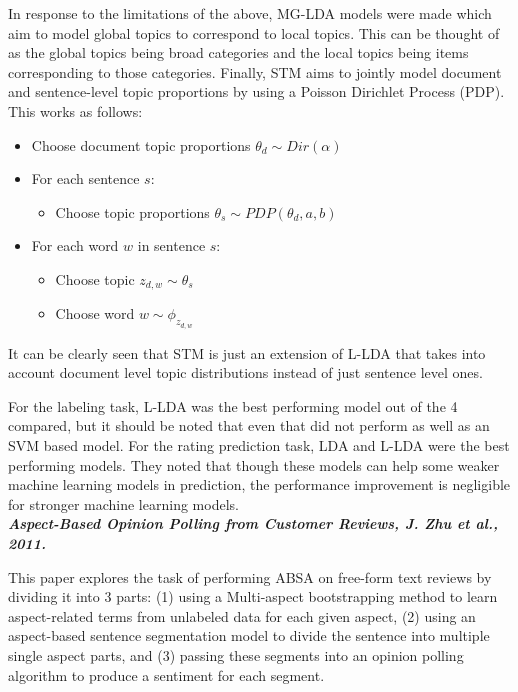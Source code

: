 \documentclass[conference]{IEEEtran}
\begin{document}
In response to the limitations of the above, MG-LDA models were made which aim to model global topics to correspond to local topics. This can be thought of as the global topics being broad categories and the local topics being items corresponding to those categories. Finally, STM aims to jointly model document and sentence-level topic proportions by using a Poisson Dirichlet Process (PDP). This works as follows:
\begin{itemize}
\item Choose document topic proportions $\theta_d \sim Dir(\alpha)$

\item For each sentence $s$:
  \begin{itemize}
  \item Choose topic proportions $\theta_s \sim PDP(\theta_d, a, b)$
  \end{itemize}

\item For each word $w$ in sentence $s$:
  \begin{itemize}
    \item Choose topic $z_{d,w} \sim \theta_s$
    \item Choose word $w \sim \phi_{z_{d,w}}$
  \end{itemize}
\end{itemize}
It can be clearly seen that STM is just an extension of L-LDA that takes into account document level topic distributions instead of just sentence level ones.

For the labeling task, L-LDA was the best performing model out of the 4 compared, but it should be noted that even that did not perform as well as an SVM based model. For the rating prediction task, LDA and L-LDA were the best performing models. They noted that though these models can help some weaker machine learning models in prediction, the performance improvement is negligible for stronger machine learning models.\\

\textit{\textbf{Aspect-Based Opinion Polling
from Customer Reviews, J. Zhu et al., 2011.}}

This paper explores the task of performing ABSA on free-form text reviews by dividing it into 3 parts: (1) using a Multi-aspect bootstrapping method to learn aspect-related terms from unlabeled data for each given aspect, (2) using an aspect-based sentence segmentation model to divide the sentence into multiple single aspect parts, and (3) passing these segments into an opinion polling algorithm to produce a sentiment for each segment.
\end{document}
